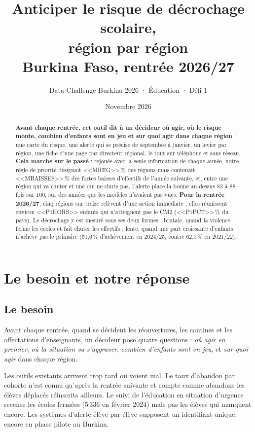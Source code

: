 \documentclass[11pt,a4paper]{article}
\title{\textbf{Anticiper le risque de décrochage scolaire,\\ région par région}\\[4pt]\large Burkina Faso, rentrée 2026/27}
\author{Data Challenge Burkina 2026 · Éducation · Défi 1}
\date{Novembre 2026}
\begin{document}
\maketitle

\begin{abstract}
\noindent \textbf{Avant chaque rentrée, cet outil dit à un décideur où agir, où le risque monte, combien d'enfants sont en jeu et sur quoi agir dans chaque région} : une carte du risque, une alerte qui se précise de septembre à janvier, un levier par région, une fiche d'une page par directeur régional, le tout sur téléphone et sans réseau. \textbf{Cela marche sur le passé} : rejouée avec la seule information de chaque année, notre règle de priorité désignait <<MREG>>\,\% des régions mais contenait <<MBAISSES>>\,\% des fortes baisses d'effectifs de l'année suivante, et, entre une région qui va chuter et une qui ne chute pas, l'alerte place la bonne au-dessus 83 à 88 fois sur 100, sur des années que les modèles n'avaient pas vues. \textbf{Pour la rentrée 2026/27}, cinq régions sur treize relèvent d'une action immédiate ; elles réunissent environ <<P1HORS>> enfants qui n'atteignent pas le CM2 (<<P1PCT>>\,\% du pays). Le décrochage y est mesuré sous ses deux formes : brutale, quand la violence ferme les écoles et fait chuter les effectifs ; lente, quand une part croissante d'enfants n'achève pas le primaire (51,6\,\% d'achèvement en 2024/25, contre 62,0\,\% en 2021/22).
\end{abstract}

\section{Le besoin et notre réponse}
\subsection{Le besoin}
Avant chaque rentrée, quand se décident les réouvertures, les cantines et les affectations d'enseignants, un décideur pose quatre questions : \emph{où agir en premier}, \emph{où la situation va s'aggraver}, \emph{combien d'enfants sont en jeu}, et \emph{sur quoi agir} dans chaque région.

Les outils existants arrivent trop tard ou voient mal. Le taux d'abandon par cohorte n'est connu qu'après la rentrée suivante et compte comme abandons les élèves déplacés réinscrits ailleurs. Le suivi de l'éducation en situation d'urgence recense les écoles fermées (5\,336 en février 2024) mais pas les élèves qui manquent encore. Les systèmes d'alerte élève par élève supposent un identifiant unique, encore en phase pilote au Burkina.
\end{document}
